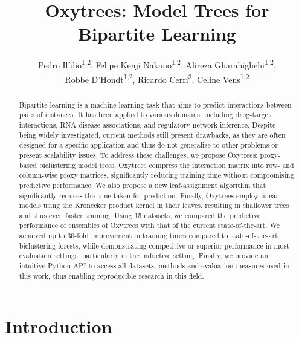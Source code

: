 \documentclass[letterpaper]{article}
\title{Oxytrees: Model Trees for Bipartite Learning}
\author{
    Pedro Ilídio\textsuperscript{\rm 1,\rm 2},
    Felipe Kenji Nakano\textsuperscript{\rm 1,\rm 2},
    Alireza Gharahighehi\textsuperscript{\rm 1,\rm 2},\\
    Robbe D'Hondt\textsuperscript{\rm 1,\rm 2},
    Ricardo Cerri\textsuperscript{\rm 3},
    Celine Vens\textsuperscript{\rm 1,\rm 2}
}
\begin{document}
\maketitle


\begin{abstract}
Bipartite learning is a machine learning task that aims to predict interactions between pairs of instances. It has been applied to various domains, including drug-target interactions, RNA-disease associations, and regulatory network inference. Despite being widely investigated, current methods still present drawbacks, as they are often designed for a specific application and thus do not generalize to other problems or present scalability issues.
To address these challenges, we propose Oxytrees: proxy-based biclustering model trees. Oxytrees compress the interaction matrix into row- and column-wise proxy matrices, significantly reducing training time without compromising predictive performance.
We also propose a new leaf-assignment algorithm that significantly reduces the time taken for prediction.
Finally, Oxytrees employ linear models using the Kronecker product kernel in their leaves, resulting in shallower trees and thus even faster training. Using 15 datasets, we compared the predictive performance of ensembles of Oxytrees with that of the current state-of-the-art.
We achieved up to 30-fold improvement in training times compared to state-of-the-art biclustering forests, while demonstrating competitive or superior performance in most evaluation settings, particularly in the inductive setting.
Finally, we provide an intuitive Python API to access all datasets, methods and evaluation measures used in this work, thus enabling reproducible research in this field.
\end{abstract}

\begin{links}
\end{links}


\section{Introduction}
\label{sec:introduction}
\end{document}
